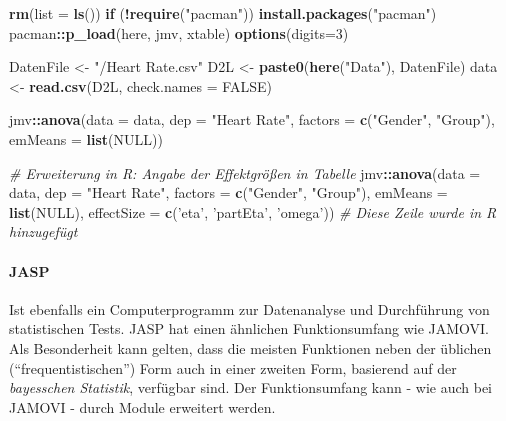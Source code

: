 \documentclass[]{article}
\newenvironment{Shaded}{\begin{snugshade}}{\end{snugshade}}
\newcommand{\KeywordTok}[1]{\textcolor[rgb]{0.13,0.29,0.53}{\textbf{#1}}}
\newcommand{\DataTypeTok}[1]{\textcolor[rgb]{0.13,0.29,0.53}{#1}}
\newcommand{\DecValTok}[1]{\textcolor[rgb]{0.00,0.00,0.81}{#1}}
\newcommand{\StringTok}[1]{\textcolor[rgb]{0.31,0.60,0.02}{#1}}
\newcommand{\CommentTok}[1]{\textcolor[rgb]{0.56,0.35,0.01}{\textit{#1}}}
\newcommand{\OtherTok}[1]{\textcolor[rgb]{0.56,0.35,0.01}{#1}}
\newcommand{\ControlFlowTok}[1]{\textcolor[rgb]{0.13,0.29,0.53}{\textbf{#1}}}
\newcommand{\OperatorTok}[1]{\textcolor[rgb]{0.81,0.36,0.00}{\textbf{#1}}}
\newcommand{\NormalTok}[1]{#1}
\let\oldparagraph\paragraph
\renewcommand{\paragraph}[1]{\oldparagraph{#1}\mbox{}}
\begin{document}
\begin{Shaded}
\begin{Highlighting}[]
  \KeywordTok{rm}\NormalTok{(}\DataTypeTok{list =} \KeywordTok{ls}\NormalTok{())}
  \ControlFlowTok{if}\NormalTok{ (}\OperatorTok{!}\KeywordTok{require}\NormalTok{(}\StringTok{"pacman"}\NormalTok{)) }\KeywordTok{install.packages}\NormalTok{(}\StringTok{"pacman"}\NormalTok{)}
\NormalTok{  pacman}\OperatorTok{::}\KeywordTok{p_load}\NormalTok{(here, jmv, xtable)}
  \KeywordTok{options}\NormalTok{(}\DataTypeTok{digits=}\DecValTok{3}\NormalTok{)}
  
\NormalTok{  DatenFile <-}\StringTok{ "/Heart Rate.csv"}
\NormalTok{  D2L       <-}\StringTok{ }\KeywordTok{paste0}\NormalTok{(}\KeywordTok{here}\NormalTok{(}\StringTok{"Data"}\NormalTok{), DatenFile)}
\NormalTok{  data      <-}\StringTok{ }\KeywordTok{read.csv}\NormalTok{(D2L, }\DataTypeTok{check.names =} \OtherTok{FALSE}\NormalTok{)}
  
\NormalTok{  jmv}\OperatorTok{::}\KeywordTok{anova}\NormalTok{(}\DataTypeTok{data =}\NormalTok{ data,}
             \DataTypeTok{dep =} \StringTok{"Heart Rate"}\NormalTok{,}
             \DataTypeTok{factors =} \KeywordTok{c}\NormalTok{(}\StringTok{"Gender"}\NormalTok{, }\StringTok{"Group"}\NormalTok{),}
             \DataTypeTok{emMeans =} \KeywordTok{list}\NormalTok{(}\OtherTok{NULL}\NormalTok{))}
  
  \CommentTok{# Erweiterung in R: Angabe der Effektgrößen in Tabelle  }
\NormalTok{  jmv}\OperatorTok{::}\KeywordTok{anova}\NormalTok{(}\DataTypeTok{data =}\NormalTok{ data,}
             \DataTypeTok{dep =} \StringTok{"Heart Rate"}\NormalTok{,}
             \DataTypeTok{factors =} \KeywordTok{c}\NormalTok{(}\StringTok{"Gender"}\NormalTok{, }\StringTok{"Group"}\NormalTok{),}
             \DataTypeTok{emMeans =} \KeywordTok{list}\NormalTok{(}\OtherTok{NULL}\NormalTok{),}
             \DataTypeTok{effectSize =} \KeywordTok{c}\NormalTok{(}\StringTok{'eta'}\NormalTok{, }\StringTok{'partEta'}\NormalTok{, }\StringTok{'omega'}\NormalTok{)) }\CommentTok{# Diese Zeile wurde in R hinzugefügt}
\end{Highlighting}
\end{Shaded}

\paragraph{JASP}\label{jasp}

Ist ebenfalls ein Computerprogramm zur Datenanalyse und Durchführung von
statistischen Tests. JASP hat einen ähnlichen Funktionsumfang wie
JAMOVI. Als Besonderheit kann gelten, dass die meisten Funktionen neben
der üblichen (``frequentistischen'') Form auch in einer zweiten Form,
basierend auf der \emph{bayesschen Statistik}, verfügbar sind. Der
Funktionsumfang kann - wie auch bei JAMOVI - durch Module erweitert
werden.
\end{document}

